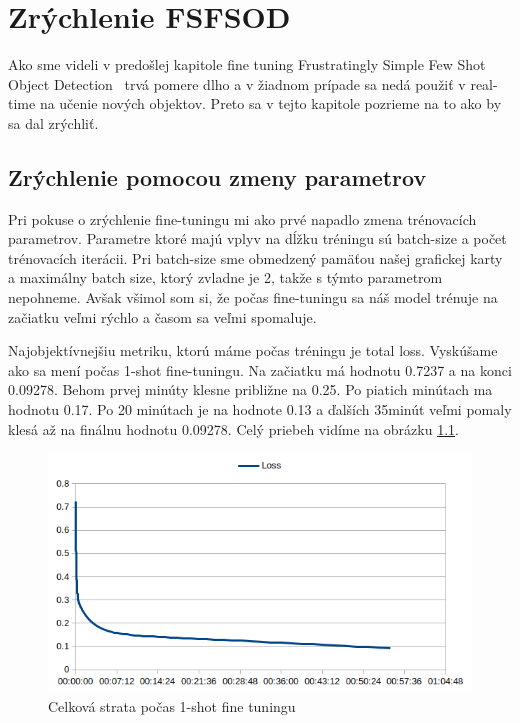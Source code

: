 \chapter{Zrýchlenie FSFSOD}\label{chap:proposal}

Ako sme videli v predošlej kapitole fine tuning Frustratingly Simple Few Shot Object Detection~\cite{FSFSODT} trvá pomere dlho a v žiadnom prípade sa nedá použiť v real-time na učenie nových objektov. Preto sa v tejto kapitole pozrieme na to ako by sa dal zrýchliť. 

\section{Zrýchlenie pomocou zmeny parametrov}

Pri pokuse o zrýchlenie fine-tuningu mi ako prvé napadlo zmena trénovacích parametrov. Parametre ktoré majú vplyv na dĺžku tréningu sú batch-size a počet trénovacích iterácii. Pri batch-size sme obmedzený pamäťou našej grafickej karty a maximálny batch size, ktorý zvladne je 2, takže s týmto parametrom nepohneme. Avšak všimol som si, že počas fine-tuningu sa náš model trénuje na začiatku veľmi rýchlo a časom sa veľmi spomaluje. 

Najobjektívnejšiu metriku, ktorú máme počas tréningu je total loss. Vyskúšame ako sa mení počas 1-shot fine-tuningu. Na začiatku má hodnotu 0.7237 a na konci 0.09278. Behom prvej minúty klesne približne na 0.25. Po piatich minútach ma hodnotu 0.17. Po 20 minútach je na hodnote 0.13 a ďalších 35minút veľmi pomaly klesá až na finálnu hodnotu 0.09278. Celý priebeh vidíme na obrázku \ref{fig:image5}.

\begin{figure}[H]
\includegraphics[width=\textwidth]{images/1_shot_training_curve.png}
\centering
\caption{Celková strata počas 1-shot fine tuningu}
\label{fig:image5}
\end{figure}

